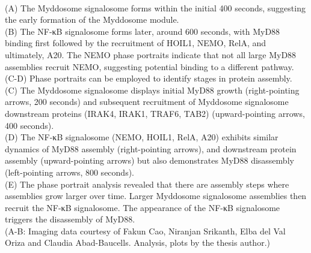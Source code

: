 \begin{centering}
{\\
(A) The Myddosome signalosome forms within the initial 400 seconds, suggesting the early formation of the Myddosome module.
\vspace{1em}
\\
(B) The NF-κB signalosome forms later, around 600 seconds, with MyD88 binding first followed by the recruitment of HOIL1, NEMO, RelA, and ultimately, A20. The NEMO phase portraits indicate that not all large MyD88 assemblies recruit NEMO, suggesting potential binding to a different pathway.
\vspace{1em}
\\
(C-D) Phase portraits can be employed to identify stages in protein assembly.
\vspace{1em}
\\
(C) The Myddosome signalosome displays initial MyD88 growth (right-pointing arrows, 200 seconds) and subsequent recruitment of Myddosome signalosome downstream proteins (IRAK4, IRAK1, TRAF6, TAB2) (upward-pointing arrows, 400 seconds).
\vspace{1em}
\\
(D) The NF-κB signalosome (NEMO, HOIL1, RelA, A20) exhibits similar dynamics of MyD88 assembly (right-pointing arrows), and downstream protein assembly (upward-pointing arrows) but also demonstrates MyD88 disassembly (left-pointing arrows, 800 seconds).
\vspace{1em}
\\
(E) The phase portrait analysis revealed that there are assembly steps where assemblies grow larger over time. Larger Myddosome signalosome assemblies then recruit the NF-κB signalosome. The appearance of the NF-κB signalosome triggers the disassembly of MyD88.
\vspace{1em}
\\
(A-B: Imaging data courtesy of Fakun Cao, Niranjan Srikanth, Elba del Val Oriza and Claudia Abad-Baucells. Analysis, plots by the thesis author.)}
\label{p2:S4}
\end{centering}


